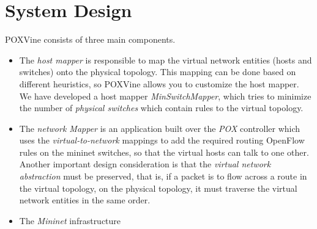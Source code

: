 \chapter{System Design}
POXVine consists of three main components.
\begin{itemize}
	\item The \emph{host mapper} is responsible to map the virtual network entities (hosts and switches) onto the physical topology. This mapping can be done based on different heuristics, so POXVine allows you to customize the host mapper. We have developed a host mapper \emph{MinSwitchMapper}, which tries to minimize the number of \emph{physical switches} which contain rules to the virtual topology.
	
	\item The \emph{network Mapper} is an application built over the \emph{POX} controller which uses the \emph{virtual-to-network} mappings to add the required routing OpenFlow rules on the mininet switches, so that the virtual hosts can talk to one other. Another important design consideration is that the \emph{virtual network abstraction} must be preserved, that is, if a packet is to flow across a route in the virtual topology, on the physical topology, it must traverse the virtual network entities in the same order.
	
	\item The \emph{Mininet} infrastructure
	
\end{itemize}  
